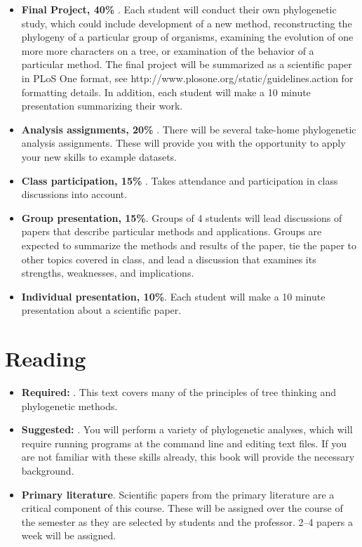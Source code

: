 \documentclass[12pt]{article}
\begin{document}
\begin{itemize}
\item {\bf Final Project, 40\% }. Each student will conduct their own phylogenetic study, which could include development of a new method, reconstructing the phylogeny of a particular group of organisms, examining the evolution of one more more characters on a tree, or examination of the behavior of a particular method. The final project will be summarized as a scientific paper in PLoS One format, see http://www.plosone.org/static/guidelines.action for formatting details. In addition, each student will make a 10 minute presentation summarizing their work.

\item {\bf Analysis assignments, 20\% }. There will be several take-home phylogenetic analysis assignments. These will provide you with the opportunity to apply your new skills to example datasets.

\item {\bf Class participation, 15\% }. Takes attendance and participation in class discussions into account.

\item {\bf Group presentation, 15\%}. Groups of 4 students will lead discussions of papers that describe particular methods and applications. Groups are expected to summarize the methods and results of the paper, tie the paper to other topics covered in class, and lead a discussion that examines its strengths, weaknesses, and implications.

\item {\bf Individual presentation, 10\%}. Each student will make a 10 minute presentation about a scientific paper.


\end{itemize}


\section*{Reading}

\begin{itemize}
\item {\bf Required: }. This text covers many of the principles of tree thinking and phylogenetic methods.
\item {\bf Suggested: }. You will perform a variety of phylogenetic analyses, which will require running programs at the command line and editing text files. If you are not familiar with these skills already, this book will provide the necessary background.
\item {\bf Primary literature}. Scientific papers from the primary literature are a critical component of this course. These will be assigned over the course of the semester as they are selected by students and the professor. 2--4 papers a week will be assigned.

\end{itemize}
\end{document}
